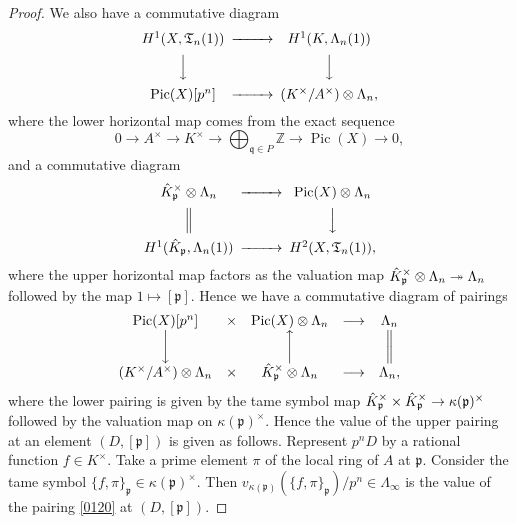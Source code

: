 \documentclass{amsart}
\theoremstyle{remark}
\numberwithin{equation}{section}
\newcommand{\onto}{\twoheadrightarrow}
\newcommand{\tensor}{\mathbin{\otimes}}
\newcommand{\Z}{\mathbb{Z}}
\newcommand{\ideal}[1]{\mathfrak{#1}}
\DeclareMathOperator{\Pic}{Pic}
\begin{document}
\begin{proof}
	We also have a commutative diagram
		\[
			\begin{CD}
					H^{1}(X, \mathfrak{T}_{n}(1))
				@>>>
					H^{1}(K, \Lambda_{n}(1))
				\\
				@VVV @VVV
				\\
					\Pic(X)[p^{n}]
				@>>>
					(K^{\times} / A^{\times}) \tensor \Lambda_{n},
			\end{CD}
		\]
	where the lower horizontal map comes from the exact sequence
		\[
				0
			\to
				A^{\times}
			\to
				K^{\times}
			\to
				\bigoplus_{\ideal{q} \in P}
					\Z
			\to
				\Pic(X)
			\to
				0,
		\]
	and a commutative diagram
		\[
			\begin{CD}
					\Hat{K}_{\ideal{p}}^{\times} \tensor \Lambda_{n}
				@>>>
					\Pic(X) \tensor \Lambda_{n}
				\\
				@| @VVV
				\\
					H^{1}(\Hat{K}_{\ideal{p}}, \Lambda_{n}(1))
				@>>>
					H^{2}(X, \mathfrak{T}_{n}(1)),
			\end{CD}
		\]
	where the upper horizontal map factors as the valuation map
	$\Hat{K}_{\ideal{p}}^{\times} \tensor \Lambda_{n} \onto \Lambda_{n}$
	followed by the map $1 \mapsto [\ideal{p}]$.
	Hence we have a commutative diagram of pairings
		\[
			\begin{array}{ccccc}
					\Pic(X)[p^{n}]
				&
					\times
				&
					\Pic(X) \tensor \Lambda_{n}
				&
					\longrightarrow
				&
					\Lambda_{n}
				\\
					\bigg \downarrow
				&
				&
					\bigg \uparrow
				&
				&
					\bigg \|
				\\
					(K^{\times} / A^{\times}) \tensor \Lambda_{n}
				&
					\times
				&
					\Hat{K}_{\ideal{p}}^{\times} \tensor \Lambda_{n}
				&
					\longrightarrow
				&
					\Lambda_{n},
			\end{array}
		\]
	where the lower pairing is given by the tame symbol map
	$\Hat{K}_{\ideal{p}}^{\times} \times \Hat{K}_{\ideal{p}}^{\times} \to \kappa(\ideal{p})^{\times}$
	followed by the valuation map on $\kappa(\ideal{p})^{\times}$.
	Hence the value of the upper pairing at an element $(D, [\ideal{p}])$ is given as follows.
	Represent $p^{n} D$ by a rational function $f \in K^{\times}$.
	Take a prime element $\pi$ of the local ring of $A$ at $\ideal{p}$.
	Consider the tame symbol $\{f, \pi\}_{\ideal{p}} \in \kappa(\ideal{p})^{\times}$.
	Then $v_{\kappa(\ideal{p})}(\{f, \pi\}_{\ideal{p}}) / p^{n} \in \Lambda_{\infty}$
	is the value of the pairing \eqref{0120} at $(D, [\ideal{p}])$.
	

\end{proof}
\end{document}
